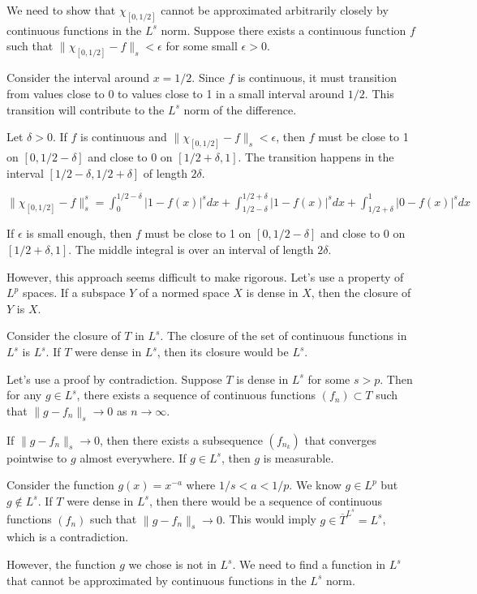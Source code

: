 We need to show that $\chi_{[0, 1/2]}$ cannot be approximated arbitrarily closely by continuous functions in the $L^s$ norm. Suppose there exists a continuous function $f$ such that $\|\chi_{[0, 1/2]} - f\|_s < \epsilon$ for some small $\epsilon > 0$.

Consider the interval around $x = 1/2$. Since $f$ is continuous, it must transition from values close to 0 to values close to 1 in a small interval around $1/2$. This transition will contribute to the $L^s$ norm of the difference.

Let $\delta > 0$. If $f$ is continuous and $\|\chi_{[0, 1/2]} - f\|_s < \epsilon$, then $f$ must be close to 1 on $[0, 1/2 - \delta]$ and close to 0 on $[1/2 + \delta, 1]$. The transition happens in the interval $[1/2 - \delta, 1/2 + \delta]$ of length $2\delta$.

$\|\chi_{[0, 1/2]} - f\|_s^s = \int_0^{1/2 - \delta} |1 - f(x)|^s dx + \int_{1/2 - \delta}^{1/2 + \delta} |1 - f(x)|^s dx + \int_{1/2 + \delta}^1 |0 - f(x)|^s dx$

If $\epsilon$ is small enough, then $f$ must be close to 1 on $[0, 1/2 - \delta]$ and close to 0 on $[1/2 + \delta, 1]$. The middle integral is over an interval of length $2\delta$.

However, this approach seems difficult to make rigorous. Let's use a property of $L^p$ spaces. If a subspace $Y$ of a normed space $X$ is dense in $X$, then the closure of $Y$ is $X$.

Consider the closure of $T$ in $L^s$. The closure of the set of continuous functions in $L^s$ is $L^s$. If $T$ were dense in $L^s$, then its closure would be $L^s$.

Let's use a proof by contradiction. Suppose $T$ is dense in $L^s$ for some $s > p$. Then for any $g \in L^s$, there exists a sequence of continuous functions $(f_n) \subset T$ such that $\|g - f_n\|_s \to 0$ as $n \to \infty$.

If $\|g - f_n\|_s \to 0$, then there exists a subsequence $(f_{n_k})$ that converges pointwise to $g$ almost everywhere.
If $g \in L^s$, then $g$ is measurable.

Consider the function $g(x) = x^{-a}$ where $1/s < a < 1/p$. We know $g \in L^p$ but $g \notin L^s$.
If $T$ were dense in $L^s$, then there would be a sequence of continuous functions $(f_n)$ such that $\|g - f_n\|_s \to 0$. This would imply $g \in \overline{T}^{L^s} = L^s$, which is a contradiction.

However, the function $g$ we chose is not in $L^s$. We need to find a function in $L^s$ that cannot be approximated by continuous functions in the $L^s$ norm.

